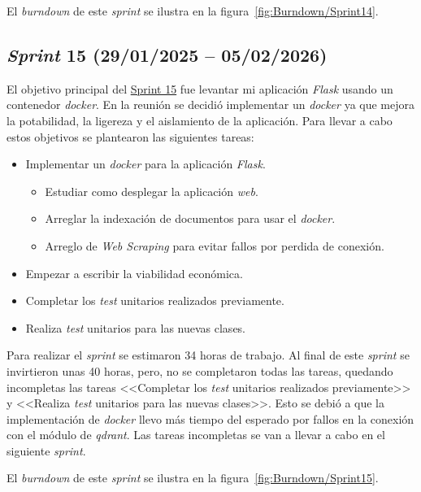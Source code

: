 El \textit{burndown} de este \textit{sprint} se ilustra en la figura~\ref{fig:Burndown/Sprint14}.

\subsection{\textit{Sprint} 15 (29/01/2025 -- 05/02/2026)}
El objetivo principal del \href{https://github.com/lbr1014/TFG_RAG/milestone/15?closed=1}{Sprint 15} fue levantar mi aplicación \textit{Flask} usando un contenedor \textit{docker}. En la reunión se decidió implementar un \textit{docker} ya que mejora la potabilidad, la ligereza y el aislamiento de la aplicación. Para llevar a cabo estos objetivos se plantearon las siguientes tareas:
\begin{itemize}
\tightlist
	\item Implementar un \textit{docker} para la aplicación \textit{Flask}.
	\begin{itemize}
	\tightlist
		\item Estudiar como desplegar la aplicación \textit{web}.
		\item Arreglar la indexación de documentos para usar el \textit{docker}.
		\item Arreglo de \textit{Web Scraping} para evitar fallos por perdida de conexión.
	\end{itemize}
	\item Empezar a escribir la viabilidad económica.
	\item Completar los \textit{test} unitarios realizados previamente.
	\item Realiza \textit{test} unitarios para las nuevas clases.
\end{itemize}

Para realizar el \textit{sprint} se estimaron 34 horas de trabajo. Al final de este \textit{sprint} se invirtieron unas 40 horas, pero, no se completaron todas las tareas, quedando incompletas las tareas <<Completar los \textit{test} unitarios realizados previamente>> y <<Realiza \textit{test} unitarios para las nuevas clases>>. Esto se debió a que la implementación de \textit{docker} llevo más tiempo del esperado por fallos en la conexión con el módulo de \textit{qdrant}. Las tareas incompletas se van a llevar a cabo en el siguiente \textit{sprint}.

El \textit{burndown} de este \textit{sprint} se ilustra en la figura~\ref{fig:Burndown/Sprint15}.

